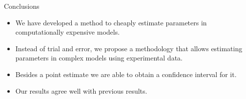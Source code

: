 \documentclass[11pt]{beamer}
\theoremstyle{plain}
\theoremstyle{definition}
\begin{document}
\begin{frame}{Conclusions}
\begin{itemize}
\item We have developed a method to cheaply estimate parameters in computationally expensive models.
\item Instead of trial and error, we propose a methodology that allows estimating
parameters in complex models using experimental data.
\item Besides a point estimate we are able to obtain a confidence interval for it.
\item Our results agree well with previous results.
\end{itemize}


\end{frame}
\end{document}
